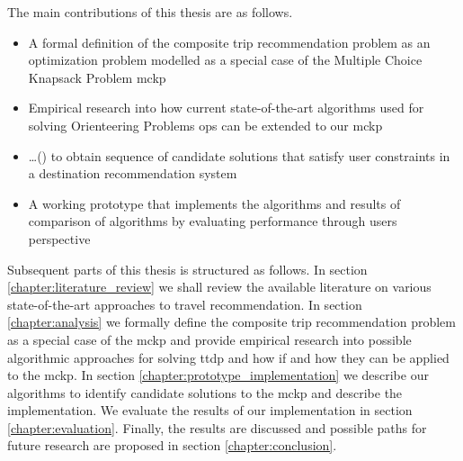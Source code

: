 The main contributions of this thesis are as follows.

\begin{itemize}
    \item A formal definition of the composite trip recommendation problem as an optimization problem modelled as a special case of the Multiple Choice Knapsack Problem \gls{mckp}
    \item Empirical research into how current state-of-the-art algorithms used for solving Orienteering Problems \glspl{op} can be extended to our \gls{mckp}
    \item \ldots () to obtain sequence of candidate solutions that satisfy user constraints in a destination recommendation system
    \item A working prototype that implements the algorithms and results of comparison of algorithms by evaluating performance through users perspective 
\end{itemize}


Subsequent parts of this thesis is structured as follows. In section \ref{chapter:literature_review} we shall review the available literature on various state-of-the-art approaches to travel recommendation. In section \ref{chapter:analysis} we formally define the composite trip recommendation problem as a special case of the \gls{mckp} and provide empirical research into possible algorithmic approaches for solving \gls{ttdp} and how if and how they can be applied to the \gls{mckp}. In section \ref{chapter:prototype_implementation} we describe our algorithms to identify candidate solutions to the \gls{mckp} and describe the implementation. We evaluate the results of our implementation in section \ref{chapter:evaluation}. Finally, the results are discussed and possible paths for future research are proposed in section \ref{chapter:conclusion}. 



